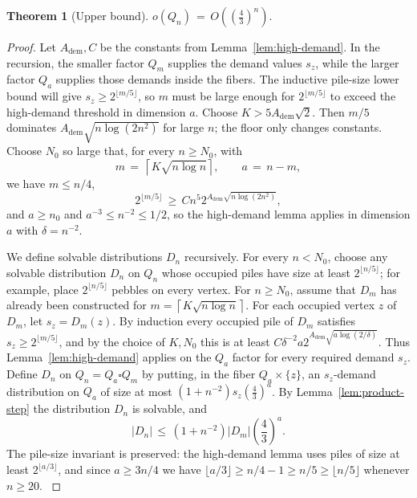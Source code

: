 \documentclass[11pt]{article}
\newcommand{\Adem}{A_{\mathrm{dem}}}
\theoremstyle{plain}
\newtheorem{theorem}{Theorem}
\theoremstyle{definition}
\begin{document}
\begin{theorem}[Upper bound]\label{thm:upper}
$o(Q_n)\,=\,O\!\left(\left(\frac43\right)^n\right).$
\end{theorem}
\begin{proof}
Let $\Adem,C$ be the constants from Lemma~\ref{lem:high-demand}. In the recursion, the
smaller factor $Q_m$ supplies the demand values $s_z$, while the larger factor $Q_a$
supplies those demands inside the fibers.  The inductive pile-size lower bound will give
$s_z\ge 2^{\lfloor m/5\rfloor}$, so $m$ must be large enough for
$2^{\lfloor m/5\rfloor}$ to exceed the high-demand threshold in dimension $a$.
Choose $K>5\Adem\sqrt 2$.  Then $m/5$ dominates
$\Adem\sqrt{n\log(2n^2)}$ for large $n$; the floor only changes constants.
Choose $N_0$ so large
that, for every $n\ge N_0$, with
\[
m\,=\,\left\lceil K\sqrt{n\log n}\right\rceil,\qquad a\,=\,n-m,
\]
we have $m\le n/4$,
\[
2^{\lfloor m/5\rfloor}\,\ge\, C n^5 2^{\Adem\sqrt{n\log(2n^2)}},
\]
and $a\ge n_0$ and $a^{-3}\le n^{-2}\le 1/2$, so the high-demand lemma applies in
dimension $a$ with $\delta=n^{-2}$.
\label{def:parameters}

We define solvable distributions $D_n$ recursively.  For every $n<N_0$, choose any
solvable distribution $D_n$ on $Q_n$ whose occupied piles have size at least
$2^{\lfloor n/5\rfloor}$; for example, place $2^{\lfloor n/5\rfloor}$ pebbles on every
vertex.  For $n\ge N_0$, assume
that $D_m$ has already been constructed for
$m=\left\lceil K\sqrt{n\log n}\right\rceil$.
For each occupied vertex $z$ of $D_m$, let $s_z=D_m(z)$.  By induction every occupied
pile of $D_m$ satisfies $s_z\ge 2^{\lfloor m/5\rfloor}$, and by the choice of
$K,N_0$ this is at least $C\delta^{-2}a2^{\Adem\sqrt{a\log(2/\delta)}}$.
Thus Lemma~\ref{lem:high-demand} applies on the $Q_a$ factor for every required demand
$s_z$.  Define $D_n$ on $Q_n=Q_a\square Q_m$ by putting, in the fiber $Q_a\times\{z\}$, an
$s_z$-demand distribution on $Q_a$ of size at most $(1+n^{-2})s_z\left(\frac43\right)^a$.
By Lemma~\ref{lem:product-step} the distribution $D_n$ is solvable, and
\[
|D_n|\,\le\, (1+n^{-2})|D_m|\left(\frac43\right)^a.
\]
The pile-size invariant is preserved: the high-demand lemma uses piles of size at least
$2^{\lfloor a/3\rfloor}$, and since $a\ge 3n/4$ we have
$\lfloor a/3\rfloor\ge n/4-1\ge n/5\ge \lfloor n/5\rfloor$ whenever $n\ge 20$.
\label{lem:recurrence}


\end{proof}
\end{document}
